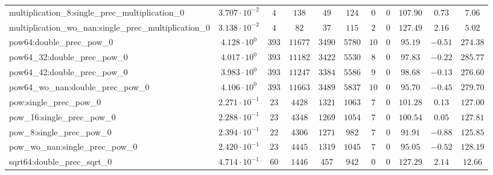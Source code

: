 \begin{tabular}{|l|c|c|c|c|c|c|c|c|c|c|}
multiplication\_8:single\_prec\_multiplication\_0         & $ 3.707 \cdot 10^{-2} $ & $ 4      $ & $ 138    $ & $ 49    $ & $ 124   $ & $ 0   $ & $ 0 $ & $ 107.90      $ & $ 0.73    $ & $ 7.06    $ \\
multiplication\_wo\_nan:single\_prec\_multiplication\_0   & $ 3.138 \cdot 10^{-2} $ & $ 4      $ & $ 82     $ & $ 37    $ & $ 115   $ & $ 2   $ & $ 0 $ & $ 127.49      $ & $ 2.16    $ & $ 5.02    $ \\
pow64:double\_prec\_pow\_0                                & $ 4.128 \cdot 10^{0}  $ & $ 393    $ & $ 11677  $ & $ 3490  $ & $ 5780  $ & $ 10  $ & $ 0 $ & $ 95.19       $ & $ -0.51   $ & $ 274.38  $ \\
pow64\_32:double\_prec\_pow\_0                            & $ 4.017 \cdot 10^{0}  $ & $ 393    $ & $ 11182  $ & $ 3422  $ & $ 5530  $ & $ 8   $ & $ 0 $ & $ 97.83       $ & $ -0.22   $ & $ 285.77  $ \\
pow64\_42:double\_prec\_pow\_0                            & $ 3.983 \cdot 10^{0}  $ & $ 393    $ & $ 11247  $ & $ 3384  $ & $ 5586  $ & $ 9   $ & $ 0 $ & $ 98.68       $ & $ -0.13   $ & $ 276.60  $ \\
pow64\_wo\_nan:double\_prec\_pow\_0                       & $ 4.106 \cdot 10^{0}  $ & $ 393    $ & $ 11663  $ & $ 3489  $ & $ 5837  $ & $ 10  $ & $ 0 $ & $ 95.70       $ & $ -0.45   $ & $ 279.70  $ \\
pow:single\_prec\_pow\_0                                  & $ 2.271 \cdot 10^{-1} $ & $ 23     $ & $ 4428   $ & $ 1321  $ & $ 1063  $ & $ 7   $ & $ 0 $ & $ 101.28      $ & $ 0.13    $ & $ 127.00  $ \\
pow\_16:single\_prec\_pow\_0                              & $ 2.288 \cdot 10^{-1} $ & $ 23     $ & $ 4348   $ & $ 1269  $ & $ 1054  $ & $ 7   $ & $ 0 $ & $ 100.54      $ & $ 0.05    $ & $ 127.81  $ \\
pow\_8:single\_prec\_pow\_0                               & $ 2.394 \cdot 10^{-1} $ & $ 22     $ & $ 4306   $ & $ 1271  $ & $ 982   $ & $ 7   $ & $ 0 $ & $ 91.91       $ & $ -0.88   $ & $ 125.85  $ \\
pow\_wo\_nan:single\_prec\_pow\_0                         & $ 2.420 \cdot 10^{-1} $ & $ 23     $ & $ 4445   $ & $ 1319  $ & $ 1045  $ & $ 7   $ & $ 0 $ & $ 95.05       $ & $ -0.52   $ & $ 128.19  $ \\
sqrt64:double\_prec\_sqrt\_0                              & $ 4.714 \cdot 10^{-1} $ & $ 60     $ & $ 1446   $ & $ 457   $ & $ 942   $ & $ 0   $ & $ 0 $ & $ 127.29      $ & $ 2.14    $ & $ 12.66   $ \\

\end{tabular}
